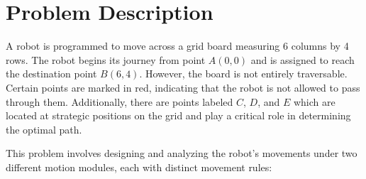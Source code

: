 \documentclass[11pt,a4paper
]{article}
\begin{document}
\section{Problem Description}
\begin{center}
\end{center}
A robot is programmed to move across a grid board measuring 6 columns by 4 rows. The robot begins its journey from point \( A(0,0) \) and is assigned to reach the destination point \( B(6,4) \). However, the board is not entirely traversable. Certain points are marked in red, indicating that the robot is not allowed to pass through them. Additionally, there are points labeled \( C \), \( D \), and \( E \) which are located at strategic positions on the grid and play a critical role in determining the optimal path.

This problem involves designing and analyzing the robot's movements under two different motion modules, each with distinct movement rules:
\end{document}
